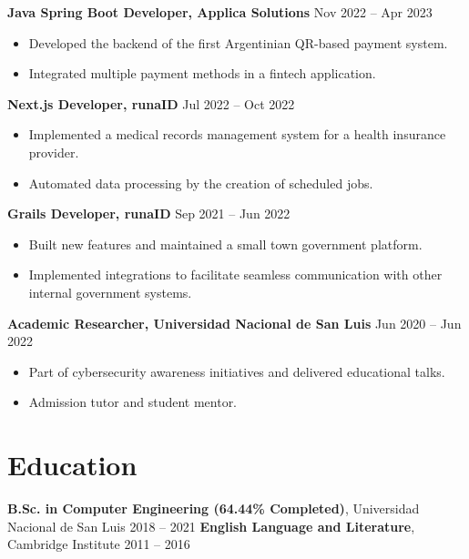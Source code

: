 \documentclass[10pt, letterpaper]{article}
\begin{document}
\textbf{Java Spring Boot Developer, Applica Solutions} \hfill Nov 2022 – Apr 2023 \
\begin{itemize}[leftmargin=10pt, noitemsep]
    \item Developed the backend of the first Argentinian QR-based payment system.
    \item Integrated multiple payment methods in a fintech application.
\end{itemize}

\textbf{Next.js Developer, runaID} \hfill Jul 2022 – Oct 2022 \
\begin{itemize}[leftmargin=10pt, noitemsep]
    \item Implemented a medical records management system for a health insurance provider.
    \item Automated data processing by the creation of scheduled jobs.
\end{itemize}

\textbf{Grails Developer, runaID} \hfill Sep 2021 – Jun 2022 \
\begin{itemize}[leftmargin=10pt, noitemsep]
    \item Built new features and maintained a small town government platform.
    \item Implemented integrations to facilitate seamless communication with other internal government systems.

\end{itemize}

\textbf{Academic Researcher, Universidad Nacional de San Luis} \hfill Jun 2020 – Jun 2022 \
\begin{itemize}[leftmargin=10pt, noitemsep]
    \item Part of cybersecurity awareness initiatives and delivered educational talks.
    \item Admission tutor and student mentor.
\end{itemize}

\section{Education}
\textbf{B.Sc. in Computer Engineering (64.44\% Completed)}, Universidad Nacional de San Luis \hfill 2018 – 2021
\textbf{English Language and Literature}, Cambridge Institute \hfill 2011 – 2016

\end{document}
